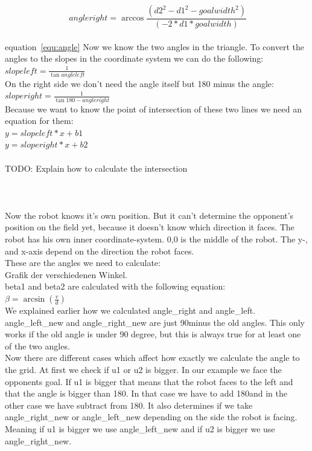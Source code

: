 \documentclass[lnicst,a4paper]{svmultln}
\begin{document}
\begin{equation}\
angleright = \arccos{\frac{(d2^2 - d1^2 - goalwidth^2)}{(-2*d1*goalwidth)}}
\label{equ:angle}
\end{equation}
\\
equation~\ref{equ:angle}
Now we know the two angles in the triangle. To convert the angles to the slopes in the coordinate system we can do the following:\\
\(slopeleft = \frac{1}{\tan{angleleft}}\)\\
On the right side we don't need the angle itself but 180 minus the angle:
\(sloperight = \frac{1}{\tan{180 - angleright}}\)\\
Because we want to know the point of intersection of these two lines we need an equation for them:\\
\(y = slopeleft * x + b1\)\\
\(y = sloperight * x + b2\)\\
\\
TODO: Explain how to calculate the intersection\\
\\
\\
\\
Now the robot knows it's own position. But it can't determine the opponent's position on the field yet, because it doesn't know which direction it faces. The robot has his own inner coordinate-system. 0,0 is the middle of the robot. The y-, and x-axis depend on the direction the robot faces. \\
These are the angles we need to calculate:\\
Grafik der verschiedenen Winkel.\\
beta1 and beta2 are calculated with the following equation:\\
\(\beta = \arcsin{(\frac{v}{d})}\)\\
We explained earlier how we calculated angle\_right and angle\_left. angle\_left\_new and angle\_right\_new are just 90\degree minus the old angles. 
This only works if the old angle is under 90 degree, but this is always true for at least one of the two angles.\\
Now there are different cases which affect how exactly we calculate the angle to the grid. At first we check if u1 or u2 is bigger. In our example we face the opponents goal. If u1 is bigger that means that the robot faces to the left and that the angle is bigger than 180\degree. In that case we have to add 180\degree and in the other case we have subtract from 180\degree. It also determines if we take angle\_right\_new or angle\_left\_new depending on the side the robot is facing. Meaning if u1 is bigger we use angle\_left\_new and if u2 is bigger we use angle\_right\_new.\\
\end{document}
